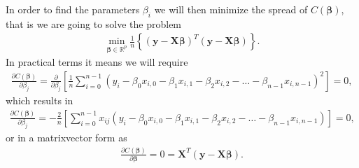 \documentclass[letterpaper,10pt,english]{sphinxmanual}
\begin{document}
In order to find the parameters \(\beta_i\) we will then minimize the spread of \(C(\boldsymbol{\beta})\), that is we are going to solve the problem
\begin{equation*}
\begin{split}
{\displaystyle \min_{\boldsymbol{\beta}\in
{\mathbb{R}}^{p}}}\frac{1}{n}\left\{\left(\boldsymbol{y}-\boldsymbol{X}\boldsymbol{\beta}\right)^T\left(\boldsymbol{y}-\boldsymbol{X}\boldsymbol{\beta}\right)\right\}.
\end{split}
\end{equation*}
In practical terms it means we will require
\begin{equation*}
\begin{split}
\frac{\partial C(\boldsymbol{\beta})}{\partial \beta_j} = \frac{\partial }{\partial \beta_j}\left[ \frac{1}{n}\sum_{i=0}^{n-1}\left(y_i-\beta_0x_{i,0}-\beta_1x_{i,1}-\beta_2x_{i,2}-\dots-\beta_{n-1}x_{i,n-1}\right)^2\right]=0,
\end{split}
\end{equation*}
which results in
\begin{equation*}
\begin{split}
\frac{\partial C(\boldsymbol{\beta})}{\partial \beta_j} = -\frac{2}{n}\left[ \sum_{i=0}^{n-1}x_{ij}\left(y_i-\beta_0x_{i,0}-\beta_1x_{i,1}-\beta_2x_{i,2}-\dots-\beta_{n-1}x_{i,n-1}\right)\right]=0,
\end{split}
\end{equation*}
or in a matrix\sphinxhyphen{}vector form as
\begin{equation*}
\begin{split}
\frac{\partial C(\boldsymbol{\beta})}{\partial \boldsymbol{\beta}} = 0 = \boldsymbol{X}^T\left( \boldsymbol{y}-\boldsymbol{X}\boldsymbol{\beta}\right).
\end{split}
\end{equation*}
\end{document}
